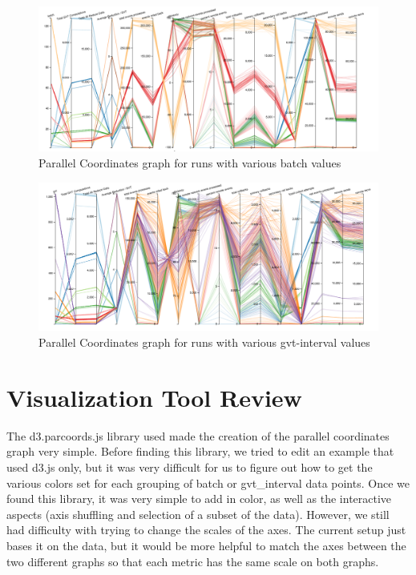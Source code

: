 \documentclass[12pt]{article}
\begin{document}
\begin{figure}[ht]
\centering
	\includegraphics[width=7in]{figures/batch.png}
\caption{Parallel Coordinates graph for runs with various batch values}
\label{fig:batch}
\end{figure}
\begin{figure}[ht]
\centering
	\includegraphics[width=7in]{figures/gvt.png}
\caption{Parallel Coordinates graph for runs with various gvt-interval values}
\label{fig:gvt}
\end{figure}

\section{Visualization Tool Review}

The d3.parcoords.js library used made the creation of the parallel coordinates graph very simple.  Before finding this library, we tried to edit an example that used d3.js only, but it was very difficult for us to figure out how to get the various colors set for each grouping of batch or gvt\_interval data points.  Once we found this library, it was very simple to add in color, as well as the interactive aspects (axis shuffling and selection of a subset of the data).  However, we still had difficulty with trying to change the scales of the axes.  The current setup just bases it on the data, but it would be more helpful to match the axes between the two different graphs so that each metric has the same scale on both graphs.  



\end{document}
